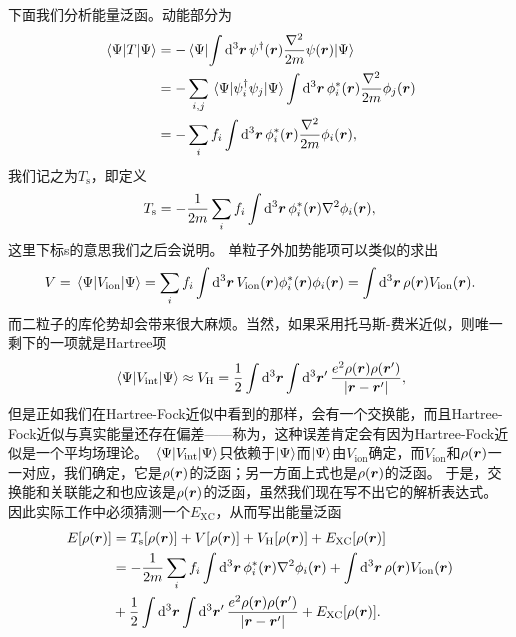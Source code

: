 下面我们分析能量泛函。动能部分为
\[
    \begin{aligned}
        \mel{\Psi}{T}{\Psi} &= - \mel{\Psi}{\int \dd[3]{\vb*{r}} \psi^\dagger(\vb*{r}) \frac{\laplacian}{2m} \psi(\vb*{r})}{\Psi} \\
        &= - \sum_{i, j} \mel{\Psi}{\psi_i^\dagger \psi_j}{\Psi} \int \dd[3]{\vb*{r}} \phi^*_i(\vb*{r}) \frac{\laplacian}{2m} \phi_j(\vb*{r}) \\
        &= - \sum_i f_i \int \dd[3]{\vb*{r}} \phi^*_i(\vb*{r}) \frac{\laplacian}{2m} \phi_i(\vb*{r}),
    \end{aligned}
\]
我们记之为$T_\text{s}$，即定义
\begin{equation}
    T_\text{s} = - \frac{1}{2m} \sum_i f_i \int \dd[3]{\vb*{r}} \phi_i^*(\vb*{r}) \laplacian \phi_i(\vb*{r}),
\end{equation}
这里下标s的意思我们之后会说明。
单粒子外加势能项可以类似的求出
\begin{equation}
    V = \mel{\Psi}{{V}_\text{ion}}{\Psi} = \sum_i f_i \int \dd[3]{\vb*{r}} V_{\text{ion}}(\vb*{r}) \phi_i^*(\vb*{r}) \phi_i(\vb*{r}) = \int \dd[3]{\vb*{r}} \rho(\vb*{r}) V_\text{ion}(\vb*{r}).
\end{equation}
而二粒子的库伦势却会带来很大麻烦。当然，如果采用托马斯-费米近似，则唯一剩下的一项就是Hartree项
\begin{equation}
    \mel{\Psi}{{V}_\text{int}}{\Psi} \approx V_{\text{H}} = \frac{1}{2} \int \dd[3]{\vb*{r}} \int \dd[3]{\vb*{r}'} \frac{e^2 \rho(\vb*{r}) \rho(\vb*{r}')}{\abs{\vb*{r} - \vb*{r}'}},
    \label{eq:dft-hartree-term}
\end{equation}
但是正如我们在Hartree-Fock近似中看到的那样，会有一个交换能，而且Hartree-Fock近似与真实能量还存在偏差——称为，这种误差肯定会有因为Hartree-Fock近似是一个平均场理论。
$\mel{\Psi}{{V}_\text{int}}{\Psi}$只依赖于$\ket{\Psi}$而$\ket{\Psi}$由$V_\text{ion}$确定，而$V_\text{ion}$和$\rho(\vb*{r})$一一对应，我们确定，它是$\rho(\vb*{r})$的泛函；另一方面上式也是$\rho(\vb*{r})$的泛函。
于是，交换能和关联能之和也应该是$\rho(\vb*{r})$的泛函，虽然我们现在写不出它的解析表达式。
因此实际工作中必须猜测一个$E_\text{XC}$，从而写出能量泛函
\begin{equation}
    \begin{aligned}
        E[\rho(\vb*{r})] &= T_\text{s}[\rho(\vb*{r})] + V[\rho(\vb*{r})] + V_\text{H}[\rho(\vb*{r})] + E_\text{XC} [\rho(\vb*{r})] \\
        &= - \frac{1}{2m} \sum_i f_i \int \dd[3]{\vb*{r}} \phi_i^*(\vb*{r}) \laplacian \phi_i(\vb*{r})
        + \int \dd[3]{\vb*{r}} \rho(\vb*{r}) V_\text{ion}(\vb*{r}) \\
        &+ \frac{1}{2} \int \dd[3]{\vb*{r}} \int \dd[3]{\vb*{r}'} \frac{e^2 \rho(\vb*{r}) \rho(\vb*{r}')}{\abs{\vb*{r} - \vb*{r}'}} + E_\text{XC} [\rho(\vb*{r})].
    \end{aligned}
    \label{eq:kohn-sham-functional}
\end{equation}
